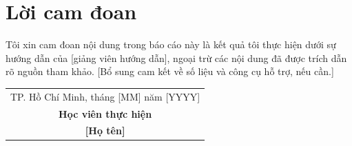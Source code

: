 \chapter*{Lời cam đoan}
\onehalfspacing
\vspace{1.0cm}

Tôi xin cam đoan nội dung trong báo cáo này là kết quả tôi thực hiện dưới sự hướng dẫn của [giảng viên hướng dẫn], ngoại trừ các nội dung đã được trích dẫn rõ nguồn tham khảo. [Bổ sung cam kết về số liệu và công cụ hỗ trợ, nếu cần.] \par

\begin{flushright}
\begin{tabular}{@{}c@{}}
    TP. Hồ Chí Minh, tháng [MM] năm [YYYY]\\
    \textbf{Học viên thực hiện}\\ [2cm]
    \textbf{[Họ tên]}
\end{tabular}
\end{flushright}

\bigskip
